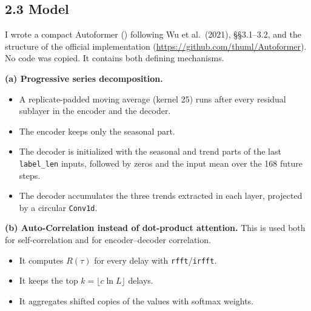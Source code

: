 \subsection*{2.3 Model}

I wrote a compact Autoformer () following Wu et al.\ (2021), \S\S3.1--3.2, and the structure of the official implementation (\url{https://github.com/thuml/Autoformer}). No code was copied. It contains both defining mechanisms.

\textbf{(a) Progressive series decomposition.}
\begin{itemize}
  \item A replicate-padded moving average (kernel 25) runs after every residual sublayer in the encoder and the decoder.
  \item The encoder keeps only the seasonal part.
  \item The decoder is initialized with the seasonal and trend parts of the last \texttt{label\_len} inputs, followed by zeros and the input mean over the 168 future steps.
  \item The decoder accumulates the three trends extracted in each layer, projected by a circular \texttt{Conv1d}.
\end{itemize}

\textbf{(b) Auto-Correlation instead of dot-product attention.} This is used both for self-correlation and for encoder--decoder correlation.
\begin{itemize}
  \item It computes $R(\tau)$ for every delay with \texttt{rfft}/\texttt{irfft}.
  \item It keeps the top $k=\lfloor c\ln L\rfloor$ delays.
  \item It aggregates shifted copies of the values with softmax weights.
\end{itemize}

